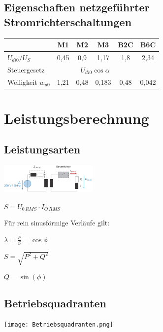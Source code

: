 \documentclass[german]{latex4ei/latex4ei_sheet}
\begin{document}
\begin{sectionbox}
	\subsection{Eigenschaften netzgeführter Stromrichterschaltungen}
		\begin{tabular}{|l|c|c|c|c|c|}
			\hline
			& \textbf{M1} & \textbf{M2}& \textbf{M3}& \textbf{B2C}& \textbf{B6C}\\
			\hline
			$U_{di0}/U_S$ & 0,45 & 0,9 & 1,17 & 1,8 & 2,34\\
			\hline
			Steuergesetz  & \multicolumn{4}{c}{$U_{di0}\cos \alpha$}&\\
			\hline
			Welligkeit $w_{u0}$ &1,21 & 0,48 & 0,183 & 0,48 & 0,042\\
			\hline			
		\end{tabular}
	\end{sectionbox}
\section{Leistungsberechnung}
	\begin{sectionbox}
		\subsection{Leistungsarten}
			\begin{bluebox}
				\item \includegraphics[width=180px]{img/Leistungsarten.png}
				\item $S = U_{0\,RMS} \cdot I_{O\,RMS}$
				\item Für rein sinusförmige Verläufe gilt:
				\item $\lambda = \frac{P}{S} = \cos \phi$
				\item $S = \sqrt{P^2+Q^2}$
				\item $Q = \sin(\phi)$
			\end{bluebox}
		\subsection{Betriebsquadranten}
			\begin{symbolbox}
				\item \texttt{[image: Betriebsquadranten.png]}
			\end{symbolbox}
	\end{sectionbox}
\end{document}

